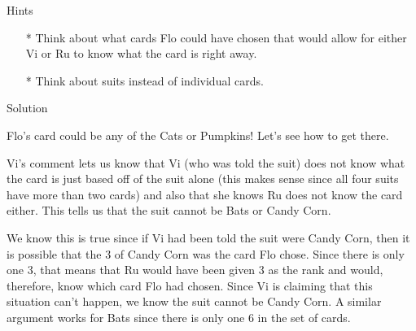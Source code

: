 

Hints
\begin{itemize}
\item[*] Think about what cards Flo could have chosen that would allow for either Vi or Ru to know what the card is right away.
\item[*] Think about suits instead of individual cards.

\end{itemize}

Solution

Flo's card could be any of the Cats or Pumpkins! Let's see how to get there.

Vi's comment lets us know that Vi (who was told the suit) does not know what the card is just based off of the suit alone (this makes sense since all four suits have more than two cards) and also that she knows Ru does not know the card either. This tells us that the suit cannot be Bats or Candy Corn.

We know this is true since if Vi had been told the suit were Candy Corn, then it is possible that the 3 of Candy Corn was the card Flo chose. Since there is only one 3, that means that Ru would have been given 3 as the rank and would, therefore, know which card Flo had chosen. Since Vi is claiming that this situation can't happen, we know the suit cannot be Candy Corn. A similar argument works for Bats since there is only one 6 in the set of cards.\\
